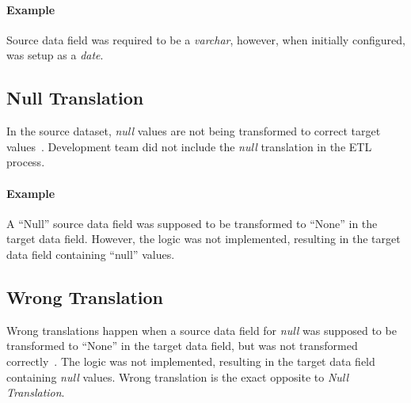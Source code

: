 \paragraph*{Example} Source data field was required to be a \textit{varchar}, however, when initially configured, was setup as a \textit{date}.


\subsection*{Null Translation}

In the source dataset, \textit{null} values are not being transformed to correct target values~\cite{web:common-defects}.
Development team did not include the \textit{null} translation in the ETL process.

\paragraph*{Example} A \enquote{Null} source data field was supposed to be transformed to \enquote{None} in the target data field.
However, the logic was not implemented, resulting in the target data field containing \enquote{null} values\footnotemark.



\subsection*{Wrong Translation}

Wrong translations happen when a source data field for \textit{null} was supposed to be transformed to \enquote{None} in the target data field, but was not transformed correctly~\cite{web:common-defects}.
The logic was not implemented, resulting in the target data field containing \textit{null} values.
Wrong translation is the exact opposite to \textit{Null Translation}.

